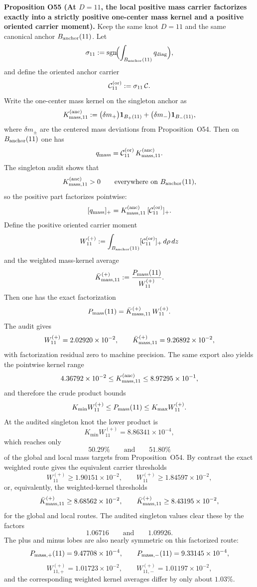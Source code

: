 \documentclass[aps,prd,onecolumn,notitlepage,nofootinbib,superscriptaddress,11pt,floatfix]{revtex4-2}
\begin{document}
\medskip\noindent\textbf{Proposition O55 (At \(D=11\), the local positive mass carrier factorizes exactly into a strictly positive one-center mass kernel and a positive oriented carrier moment).}
Keep the same knot \(D=11\) and the same canonical anchor \(B_{\rm anchor}(11)\).  Let
\[
\sigma_{11}:=\operatorname{sgn}\!\Bigl(\int_{B_{\rm anchor}(11)} q_{\rm diag}\Bigr),
\]
and define the oriented anchor carrier
\[
\mathcal C_{11}^{\rm(or)}:=\sigma_{11}\,\mathcal C.
\]
Write the one-center mass kernel on the singleton anchor as
\[
K_{{\rm mass},11}^{\rm(anc)}
:=
\bigl(\delta m_+\bigr)\mathbf 1_{B_+(11)}
+
\bigl(\delta m_-\bigr)\mathbf 1_{B_-(11)},
\]
where \(\delta m_\pm\) are the centered mass deviations from Proposition~O54.  Then on \(B_{\rm anchor}(11)\) one has
\[
q_{\rm mass}
=
\mathcal C_{11}^{\rm(or)}\,K_{{\rm mass},11}^{\rm(anc)}.
\]
The singleton audit
shows that
\[
K_{{\rm mass},11}^{\rm(anc)}>0
\qquad\text{everywhere on }B_{\rm anchor}(11),
\]
so the positive part factorizes pointwise:
\[
[q_{\rm mass}]_+
=
K_{{\rm mass},11}^{\rm(anc)}\,[\mathcal C_{11}^{\rm(or)}]_+.
\]
Define the positive oriented carrier moment
\[
W_{11}^{(+)}
:=
\int_{B_{\rm anchor}(11)}[\mathcal C_{11}^{\rm(or)}]_+\,d\rho\,dz
\]
and the weighted mass-kernel average
\[
\bar K_{{\rm mass},11}^{(+)}
:=
\frac{P_{\rm mass}(11)}{W_{11}^{(+)}}.
\]
Then one has the exact factorization
\[
P_{\rm mass}(11)
=
\bar K_{{\rm mass},11}^{(+)}\,W_{11}^{(+)}.
\]
The audit gives
\[
W_{11}^{(+)}=2.02920\times10^{-2},
\qquad
\bar K_{{\rm mass},11}^{(+)}=9.26892\times10^{-2},
\]
with factorization residual zero to machine precision.  The same export also yields the pointwise kernel range
\[
4.36792\times10^{-2}
\le
K_{{\rm mass},11}^{\rm(anc)}
\le
8.97295\times10^{-1},
\]
and therefore the crude product bounds
\[
K_{\min}W_{11}^{(+)}
\le
P_{\rm mass}(11)
\le
K_{\max}W_{11}^{(+)}.
\]
At the audited singleton knot the lower product is
\[
K_{\min}W_{11}^{(+)}
=
8.86341\times10^{-4},
\]
which reaches only
\[
50.29\%
\qquad\text{and}\qquad
51.80\%
\]
of the global and local mass targets from Proposition~O54.  By contrast the exact weighted route gives the equivalent carrier thresholds
\[
W_{11}^{(+)}\ge 1.90151\times10^{-2},
\qquad
W_{11}^{(+)}\ge 1.84597\times10^{-2},
\]
or, equivalently, the weighted-kernel thresholds
\[
\bar K_{{\rm mass},11}^{(+)}\ge 8.68562\times10^{-2},
\qquad
\bar K_{{\rm mass},11}^{(+)}\ge 8.43195\times10^{-2},
\]
for the global and local routes.  The audited singleton values clear these by the factors
\[
1.06716
\qquad\text{and}\qquad
1.09926.
\]
The plus and minus lobes are also nearly symmetric on this factorized route:
\[
P_{{\rm mass},+}(11)=9.47708\times10^{-4},
\qquad
P_{{\rm mass},-}(11)=9.33145\times10^{-4},
\]
\[
W_{11,+}^{(+)}=1.01723\times10^{-2},
\qquad
W_{11,-}^{(+)}=1.01197\times10^{-2},
\]
and the corresponding weighted kernel averages differ by only about \(1.03\%\).
\end{document}
